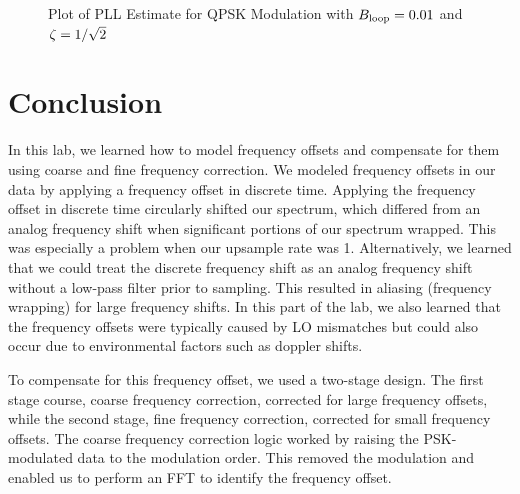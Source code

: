 \documentclass{article}
\begin{document}
\begin{figure}[H]
	\centerline{}
	\caption{Plot of PLL Estimate for QPSK Modulation with $\protect{B_\text{loop}} = 0.01$ and $\protect{\zeta = 1/\sqrt{2}}$}
	\label{fig::convergence_qpsk_Bloop_0p01_damp_sqrt_2}
\end{figure}

\section{Conclusion}

In this lab, we learned how to model frequency offsets and compensate for them using coarse and fine frequency correction. We modeled frequency offsets in our data by applying a frequency offset in discrete time. Applying the frequency offset in discrete time circularly shifted our spectrum, which differed from an analog frequency shift when significant portions of our spectrum wrapped. This was especially a problem when our upsample rate was 1. Alternatively, we learned that we could treat the discrete frequency shift as an analog frequency shift without a low-pass filter prior to sampling. This resulted in aliasing (frequency wrapping) for large frequency shifts. In this part of the lab, we also learned that the frequency offsets were typically caused by LO mismatches but could also occur due to environmental factors such as doppler shifts.

To compensate for this frequency offset, we used a two-stage design. The first stage course, coarse frequency correction, corrected for large frequency offsets, while the second stage, fine frequency correction, corrected for small frequency offsets. The coarse frequency correction logic worked by raising the PSK-modulated data to the modulation order. This removed the modulation and enabled us to perform an FFT to identify the frequency offset.
\end{document}
